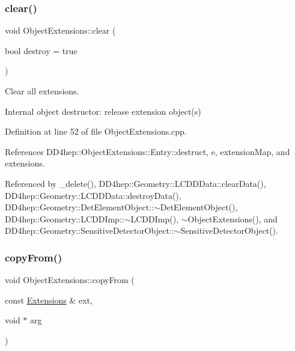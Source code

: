 \subsubsection{\texorpdfstring{clear()}{clear()}}
{\footnotesize\ttfamily void Object\+Extensions\+::clear (\begin{DoxyParamCaption}\item[{bool}]{destroy = {\ttfamily true} }\end{DoxyParamCaption})}



Clear all extensions. 

Internal object destructor\+: release extension object(s) 

Definition at line 52 of file Object\+Extensions.\+cpp.



References D\+D4hep\+::\+Object\+Extensions\+::\+Entry\+::destruct, e, extension\+Map, and extensions.



Referenced by \+\_\+delete(), D\+D4hep\+::\+Geometry\+::\+L\+C\+D\+D\+Data\+::clear\+Data(), D\+D4hep\+::\+Geometry\+::\+L\+C\+D\+D\+Data\+::destroy\+Data(), D\+D4hep\+::\+Geometry\+::\+Det\+Element\+Object\+::$\sim$\+Det\+Element\+Object(), D\+D4hep\+::\+Geometry\+::\+L\+C\+D\+D\+Imp\+::$\sim$\+L\+C\+D\+D\+Imp(), $\sim$\+Object\+Extensions(), and D\+D4hep\+::\+Geometry\+::\+Sensitive\+Detector\+Object\+::$\sim$\+Sensitive\+Detector\+Object().

\hypertarget{class_d_d4hep_1_1_object_extensions_a45c52f32737b70516b0ee96ddd3e14be}{}\label{class_d_d4hep_1_1_object_extensions_a45c52f32737b70516b0ee96ddd3e14be} 
\subsubsection{\texorpdfstring{copy\+From()}{copyFrom()}}
{\footnotesize\ttfamily void Object\+Extensions\+::copy\+From (\begin{DoxyParamCaption}\item[{const \hyperlink{class_d_d4hep_1_1_object_extensions_a882c1e22567a450f60d83eb735dd3532}{Extensions} \&}]{ext,  }\item[{void $\ast$}]{arg }\end{DoxyParamCaption})}



